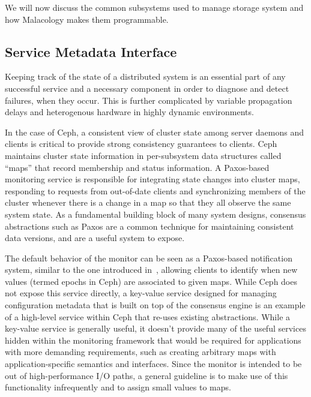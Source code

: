 \documentclass[preprint]{sigplanconf-eurosys}
\begin{document}
We will now discuss the common subsystems used to manage storage system and how
Malacology makes them programmable.

\subsection{Service Metadata Interface}
\label{sec:mon}
\label{service-metadata}

Keeping track of the state of a distributed system is an essential part of any
successful service and a necessary component in order to diagnose and detect
failures, when they occur. This is further complicated by variable propagation
delays and heterogenous hardware in highly dynamic environments.


In the case of Ceph, a consistent view of cluster state among server daemons
and clients is critical to provide strong consistency guarantees to clients.
Ceph maintains cluster state information in per-subsystem data structures
called ``maps'' that record
membership and status information.  A Paxos-based monitoring service is
responsible for integrating state changes into cluster maps, responding to
requests from out-of-date clients and synchronizing members of the cluster
whenever there is a change in a map so that they all observe the same system
state. As a fundamental building block of many system designs, consensus
abstractions such as Paxos are a common technique for maintaining consistent
data versions, and are a useful system to expose.

The default behavior of the monitor can be seen as a Paxos-based notification
system, similar to the one introduced in~\cite{burrows_chubby_2006}, allowing
clients to identify when new values (termed epochs in Ceph) are associated to
given maps.  While Ceph does not expose this service directly, a key-value
service designed for managing configuration metadata that is built on top of
the consensus engine is an example of a high-level service within Ceph that
re-uses existing abstractions.  While a key-value service is generally useful,
it doesn't provide many of the useful services hidden within the monitoring
framework that would be required for applications with more demanding
requirements, such as creating arbitrary maps with application-specific
semantics and interfaces. Since the monitor is intended to be out of high-performance I/O
paths, a general guideline is to make use of this functionality infrequently
and to assign small values to maps. 
\end{document}
